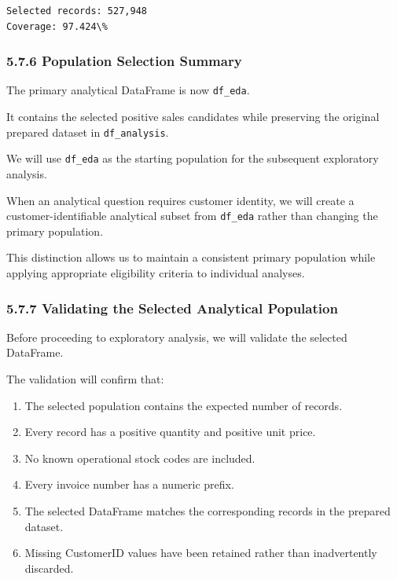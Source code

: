 \documentclass[11pt]{article}
\providecommand{\tightlist}{%
      \setlength{\itemsep}{0pt}\setlength{\parskip}{0pt}}
\begin{document}
    \begin{Verbatim}[commandchars=\\\{\}]
Selected records: 527,948
Coverage: 97.424\%
    \end{Verbatim}

    \subsubsection{5.7.6 Population Selection
Summary}\label{population-selection-summary}

The primary analytical DataFrame is now \texttt{df\_eda}.

It contains the selected positive sales candidates while preserving the
original prepared dataset in \texttt{df\_analysis}.

We will use \texttt{df\_eda} as the starting population for the
subsequent exploratory analysis.

When an analytical question requires customer identity, we will create a
customer-identifiable analytical subset from \texttt{df\_eda} rather
than changing the primary population.

This distinction allows us to maintain a consistent primary population
while applying appropriate eligibility criteria to individual analyses.

    \subsubsection{5.7.7 Validating the Selected Analytical
Population}\label{validating-the-selected-analytical-population}

Before proceeding to exploratory analysis, we will validate the selected
DataFrame.

The validation will confirm that:

\begin{enumerate}
\def\labelenumi{\arabic{enumi}.}
\tightlist
\item
  The selected population contains the expected number of records.
\item
  Every record has a positive quantity and positive unit price.
\item
  No known operational stock codes are included.
\item
  Every invoice number has a numeric prefix.
\item
  The selected DataFrame matches the corresponding records in the
  prepared dataset.
\item
  Missing CustomerID values have been retained rather than inadvertently
  discarded.
\end{enumerate}
\end{document}
